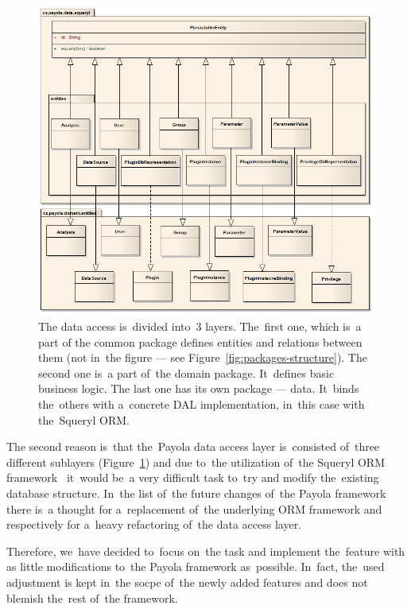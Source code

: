 \begin{figure}
	\centering
	\includegraphics[width=140mm]{img/data_entities.png}
	\caption{The data access is~divided into~3 layers. The~first one, which is~a part of
	the common package defines entities and relations between them (not in~the figure ---
	see Figure~\ref{fig:packages-structure}).
	The second one is~a part of~the domain package. It~defines basic business logic.
	The last one has its own package --- data. It~binds the~others with a~concrete DAL
	implementation, in~this case with the~Squeryl ORM. ~\cite{payola:dg}}
	\label{fig:3-layers}
\end{figure}

The second reason is~that the~Payola data access layer is~consisted of~three different sublayers
(Figure~\ref{fig:3-layers}) and 
due to~the utilization of~the Squeryl ORM framework~\cite{squeryl} it~would be~a very difficult 
task to~try and modify the~existing database structure. In~the list of~the future changes of~the Payola framework there is~a thought for a~replacement of~the underlying ORM framework
and respectively for a~heavy refactoring of~the data access layer.

Therefore, we~have decided to~focus on~the task and implement the~feature with 
as little modifications to~the Payola framework as~possible. In~fact, the~used adjustment is
kept in~the socpe of~the newly added features and does not blemish the~rest of~the framework.


